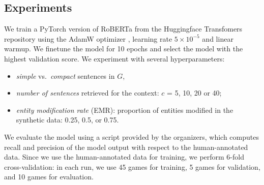 \subsection{Experiments}
\label{sec:tok-eval:experiments}

We train a PyTorch version of RoBERTa from the Huggingface Transfomers repository \cite{wolf2019HuggingFacesTS} using the AdamW optimizer \cite{loshchilov2018fixing}, learning rate $5\times10^{-5}$ and linear warmup.
We finetune the model for 10 epochs and select the model with the highest validation score.
We experiment with several hyperparameters: %
\begin{itemize}
    \item \emph{simple} vs.~\emph{compact} sentences in $G$, %
    \item  \textit{number of sentences} retrieved for the context: $c$ = 5, 10, 20 or 40;
    \item \textit{entity modification rate} (EMR): proportion of entities modified in the synthetic data: 0.25, 0.5, or 0.75.
\end{itemize}
We evaluate the model using a script provided by the organizers, which computes recall and precision of the model output with respect to the human-annotated data. Since we use the human-annotated data for training, we perform 6-fold cross-validation: in each run, we use 45 games for training, 5 games for validation, and 10 games for evaluation.


